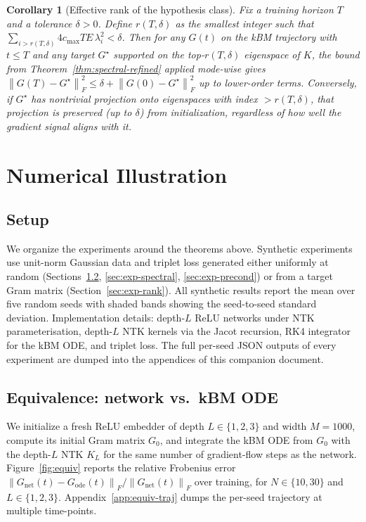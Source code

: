 \documentclass[11pt,letterpaper]{article}
\newtheorem{corollary}[theorem]{Corollary}
\newcommand{\norm}[1]{\left\|#1\right\|}
\begin{document}
\begin{corollary}[Effective rank of the hypothesis class]
\label{cor:gen}
Fix a training horizon $T$ and a tolerance $\delta > 0$. Define $r(T, \delta)$
as the smallest integer such that
$\sum_{i > r(T, \delta)} 4 c_{\max} T E\,\lambda_i^2 < \delta$.
Then for any $G(t)$ on the kBM trajectory with $t \leq T$ and any
target $G^\star$ supported on the top-$r(T, \delta)$ eigenspace of $K$,
the bound from Theorem~\ref{thm:spectral-refined} applied mode-wise
gives $\norm{G(T) - G^\star}_F^2 \leq \delta + \norm{G(0) - G^\star}_F^2$
up to lower-order terms. Conversely, if $G^\star$ has nontrivial
projection onto eigenspaces with index $> r(T, \delta)$, that projection
is preserved (up to $\delta$) from initialization, regardless of how
well the gradient signal aligns with it.
\end{corollary}

\section{Numerical Illustration}
\label{sec:experiments}

\subsection{Setup}

We organize the experiments around the theorems above. Synthetic
experiments use unit-norm Gaussian data and triplet loss generated either
uniformly at random (Sections~\ref{sec:exp-equiv},
\ref{sec:exp-spectral}, \ref{sec:exp-precond}) or from a target Gram matrix
(Section~\ref{sec:exp-rank}). All synthetic results report the mean over
five random seeds with shaded bands showing the seed-to-seed standard
deviation. Implementation details: depth-$L$ ReLU networks under NTK
parameterisation, depth-$L$ NTK kernels via the Jacot recursion, RK4
integrator for the kBM ODE, and triplet loss. The full per-seed JSON
outputs of every experiment are dumped into the appendices of this
companion document.

\subsection{Equivalence: network vs.\ kBM ODE}
\label{sec:exp-equiv}

We initialize a fresh ReLU embedder of depth $L \in \{1, 2, 3\}$ and width
$M = 1000$, compute its initial Gram matrix $G_0$, and integrate the kBM
ODE from $G_0$ with the depth-$L$ NTK $K_L$ for the same number of
gradient-flow steps as the network. Figure~\ref{fig:equiv} reports the
relative Frobenius error
$\norm{G_{\text{net}}(t) - G_{\text{ode}}(t)}_F / \norm{G_{\text{net}}(t)}_F$
over training, for $N \in \{10, 30\}$ and $L \in \{1, 2, 3\}$.
Appendix~\ref{app:equiv-traj} dumps the per-seed trajectory at multiple
time-points.
\end{document}

